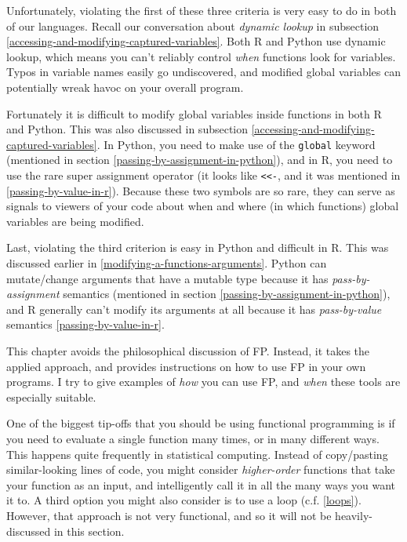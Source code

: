 \documentclass[12pt,krantz2]{krantz}
\begin{document}
Unfortunately, violating the first of these three criteria is very easy to do in both of our languages. Recall our conversation about \emph{dynamic lookup} in subsection \ref{accessing-and-modifying-captured-variables}. Both R and Python use dynamic lookup, which means you can't reliably control \emph{when} functions look for variables. Typos in variable names easily go undiscovered, and modified global variables can potentially wreak havoc on your overall program.

Fortunately it is difficult to modify global variables inside functions in both R and Python. This was also discussed in subsection \ref{accessing-and-modifying-captured-variables}. In Python, you need to make use of the \texttt{global} keyword (mentioned in section \ref{passing-by-assignment-in-python}), and in R, you need to use the rare super assignment operator (it looks like \texttt{\textless{}\textless{}-}, and it was mentioned in \ref{passing-by-value-in-r}). Because these two symbols are so rare, they can serve as signals to viewers of your code about when and where (in which functions) global variables are being modified.

Last, violating the third criterion is easy in Python and difficult in R. This was discussed earlier in \ref{modifying-a-functions-arguments}. Python can mutate/change arguments that have a mutable type because it has \emph{pass-by-assignment} semantics (mentioned in section \ref{passing-by-assignment-in-python}), and R generally can't modify its arguments at all because it has \emph{pass-by-value} semantics \ref{passing-by-value-in-r}.

This chapter avoids the philosophical discussion of FP. Instead, it takes the applied approach, and provides instructions on how to use FP in your own programs. I try to give examples of \emph{how} you can use FP, and \emph{when} these tools are especially suitable.

One of the biggest tip-offs that you should be using functional programming is if you need to evaluate a single function many times, or in many different ways. This happens quite frequently in statistical computing. Instead of copy/pasting similar-looking lines of code, you might consider \emph{higher-order} functions that take your function as an input, and intelligently call it in all the many ways you want it to. A third option you might also consider is to use a loop (c.f. \ref{loops}). However, that approach is not very functional, and so it will not be heavily-discussed in this section.
\end{document}
